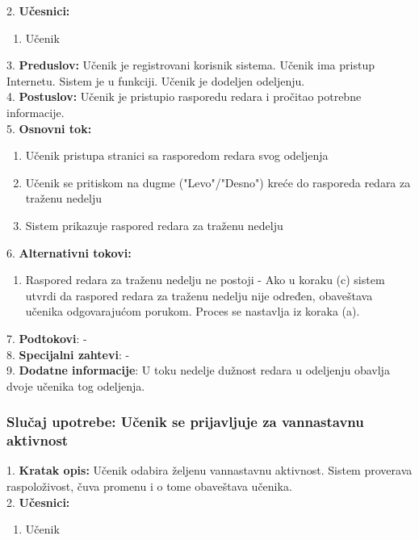 \documentclass{article}
\begin{document}
2. \textbf{Učesnici:}
\begin{enumerate} [label=(\alph*)]
\item Učenik
\end{enumerate} 

3. \textbf{Preduslov:} Učenik je registrovani korisnik sistema. Učenik ima pristup Internetu. Sistem je u funkciji. Učenik je dodeljen odeljenju. \\

4. \textbf{Postuslov:} Učenik je pristupio rasporedu redara i pročitao potrebne informacije. \\

5. \textbf{Osnovni tok:} 
\begin{enumerate} [label=(\alph*)]
\item Učenik pristupa stranici sa rasporedom redara svog odeljenja
\item Učenik se pritiskom na dugme ("Levo"/"Desno") kreće do rasporeda redara za traženu nedelju
\item Sistem prikazuje raspored redara za traženu nedelju
\end{enumerate}


6. \textbf{Alternativni tokovi:}
\begin{enumerate} [label=(\roman*)]
\item Raspored redara za traženu nedelju ne postoji - Ako u koraku (c) sistem utvrdi da raspored redara za traženu nedelju nije određen, obaveštava učenika odgovarajućom porukom. Proces se nastavlja iz koraka (a).
\end{enumerate}

7. \textbf{Podtokovi}: - \\

8. \textbf{Specijalni zahtevi}: - \\

9. \textbf{Dodatne informacije}:  U toku nedelje dužnost redara u odeljenju obavlja dvoje učenika tog odeljenja. \\


\subsubsection{Slučaj upotrebe: Učenik se prijavljuje za vannastavnu aktivnost} 
1. \textbf{Kratak opis:} Učenik odabira željenu vannastavnu aktivnost. Sistem proverava raspoloživost, čuva promenu i o tome obaveštava učenika. \\

2. \textbf{Učesnici:}
\begin{enumerate} [label=(\alph*)]
\item Učenik
\end{enumerate} 
\end{document}
